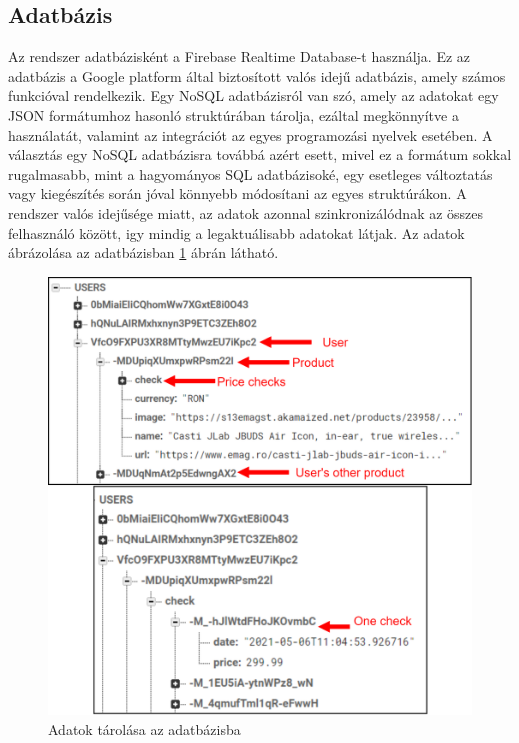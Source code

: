 \subsection{Adatbázis}

Az rendszer adatbázisként a Firebase Realtime Database-t használja. Ez az adatbázis a Google platform által biztosított valós idejű adatbázis, amely számos funkcióval rendelkezik. Egy NoSQL adatbázisról van szó, amely az adatokat egy JSON formátumhoz hasonló struktúrában tárolja, ezáltal megkönnyítve a használatát, valamint az integrációt az egyes programozási nyelvek esetében. A választás egy NoSQL adatbázisra továbbá azért esett, mivel ez a formátum sokkal rugalmasabb, mint a hagyományos SQL adatbázisoké, egy esetleges változtatás vagy kiegészítés során jóval könnyebb módosítani az egyes struktúrákon. A rendszer valós idejűsége miatt, az adatok azonnal szinkronizálódnak az összes felhasználó között, igy mindig a legaktuálisabb adatokat látjak. Az adatok ábrázolása az adatbázisban \ref{fig:database} ábrán látható.

\begin{figure}[H]
    \centering
    \includegraphics[scale=1]{figures/images/database.png}
    \caption{Adatok tárolása az adatbázisba}
    \label{fig:database}
\end{figure}

